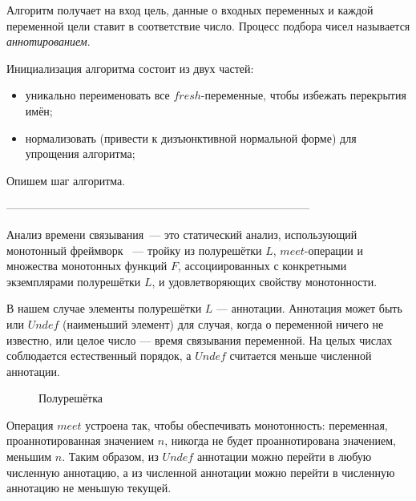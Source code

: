 \documentclass[conference,american,russian]{IEEEtran}
\begin{document}
Алгоритм получает на вход цель, данные о входных переменных и каждой переменной цели ставит в соответствие число.
Процесс подбора чисел называется \textit{аннотированием}.

Инициализация алгоритма состоит из двух частей:
\begin{itemize}
    \item уникально переименовать все $fresh$-переменные, чтобы избежать перекрытия имён;
    \item нормализовать (привести к дизъюнктивной нормальной форме) для упрощения алгоритма;
\end{itemize}

Опишем шаг алгоритма.

---------------------------------------------------------------------------------

Анализ времени связывания~--- это статический анализ, использующий монотонный фреймворк~\cite{kam1977monotone} --- тройку из полурешётки $L$, $meet$-операции и множества монотонных функций $F$, ассоциированных с конкретными экземплярами полурешётки $L$, и удовлетворяющих свойству монотонности.

В нашем случае элементы полурешётки $L$ --- аннотации. Аннотация может быть или $Undef$ (наименьший элемент) для случая, когда о переменной ничего не известно, или целое число --- время связывания переменной. На целых числах соблюдается естественный порядок, а $Undef$ считается меньше численной аннотации. 

\begin{figure}[htbp]
  \centering
  \caption{Полурешётка}
  \label{fig:image}
\end{figure}

Операция $meet$ устроена так, чтобы обеспечивать монотонность: переменная, проаннотированная значением $n$, никогда не будет проаннотирована значением, меньшим $n$. Таким образом, из $Undef$ аннотации можно перейти в любую численную аннотацию, а из численной аннотации можно перейти в численную аннотацию не меньшую текущей.
\end{document}
